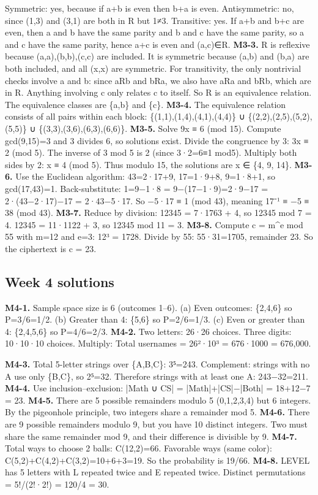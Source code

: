 \documentclass[11pt]{article}
\begin{document}
Symmetric: yes, because if a+b is even then b+a is even.
Antisymmetric: no, since (1,3) and (3,1) are both in R but 1≠3.
Transitive: yes. If a+b and b+c are even, then a and b have the same parity and b and c
have the same parity, so a and c have the same parity, hence a+c is even and (a,c)∈R.
\textbf{M3-3.} R is reflexive because (a,a),(b,b),(c,c) are included. It is symmetric because (a,b)
and (b,a) are both included, and all (x,x) are symmetric.
For transitivity, the only nontrivial checks involve a and b: since aRb and bRa, we also
have aRa and bRb, which are in R. Anything involving c only relates c to itself.
So R is an equivalence relation. The equivalence classes are \{a,b\} and \{c\}.
\textbf{M3-4.} The equivalence relation consists of all pairs within each block:
\{(1,1),(1,4),(4,1),(4,4)\} ∪ \{(2,2),(2,5),(5,2),(5,5)\} ∪ \{(3,3),(3,6),(6,3),(6,6)\}.
\textbf{M3-5.} Solve 9x ≡ 6 (mod 15). Compute gcd(9,15)=3 and 3 divides 6, so solutions exist.
Divide the congruence by 3: 3x ≡ 2 (mod 5).
The inverse of 3 mod 5 is 2 (since 3·2=6≡1 mod5). Multiply both sides by 2:
x ≡ 4 (mod 5).
Thus modulo 15, the solutions are x ∈ \{4, 9, 14\}.
\textbf{M3-6.} Use the Euclidean algorithm: 43=2·17+9, 17=1·9+8, 9=1·8+1, so gcd(17,43)=1.
Back-substitute: 1=9−1·8 = 9−(17−1·9)=2·9−17 = 2·(43−2·17)−17 = 2·43−5·17.
So −5·17 ≡ 1 (mod 43), meaning 17⁻¹ ≡ −5 ≡ 38 (mod 43).
\textbf{M3-7.} Reduce by division:
12345 = 7·1763 + 4, so 12345 mod 7 = 4.
12345 = 11·1122 + 3, so 12345 mod 11 = 3.
\textbf{M3-8.} Compute c = m\textasciicircum{}e mod 55 with m=12 and e=3:
12³ = 1728. Divide by 55: 55·31=1705, remainder 23.
So the ciphertext is c = 23.
\subsection{Week 4 solutions}
\textbf{M4-1.} Sample space size is 6 (outcomes 1–6).
(a) Even outcomes: \{2,4,6\} so P=3/6=1/2.
(b) Greater than 4: \{5,6\} so P=2/6=1/3.
(c) Even or greater than 4: \{2,4,5,6\} so P=4/6=2/3.
\textbf{M4-2.} Two letters: 26·26 choices. Three digits: 10·10·10 choices. Multiply:
Total usernames = 26²·10³ = 676·1000 = 676,000.

\textbf{M4-3.} Total 5-letter strings over \{A,B,C\}: 3⁵=243.
Complement: strings with no A use only \{B,C\}, so 2⁵=32.
Therefore strings with at least one A: 243−32=211.
\textbf{M4-4.} Use inclusion–exclusion: |Math ∪ CS| = |Math|+|CS|−|Both| = 18+12−7 = 23.
\textbf{M4-5.} There are 5 possible remainders modulo 5 (0,1,2,3,4) but 6 integers. By the
pigeonhole principle, two integers share a remainder mod 5.
\textbf{M4-6.} There are 9 possible remainders modulo 9, but you have 10 distinct integers. Two
must share the same remainder mod 9, and their difference is divisible by 9.
\textbf{M4-7.} Total ways to choose 2 balls: C(12,2)=66.
Favorable ways (same color): C(5,2)+C(4,2)+C(3,2)=10+6+3=19.
So the probability is 19/66.
\textbf{M4-8.} LEVEL has 5 letters with L repeated twice and E repeated twice.
Distinct permutations = 5!/(2!·2!) = 120/4 = 30.
\end{document}
